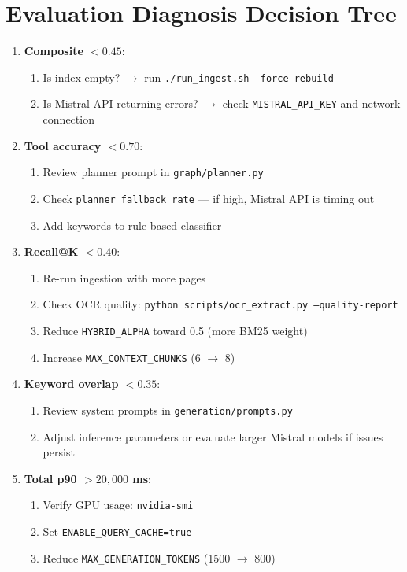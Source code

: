 \documentclass[12pt,a4paper]{report}
\begin{document}
\chapter{Evaluation Diagnosis Decision Tree}

\begin{enumerate}
  \item \textbf{Composite $< 0.45$}:
    \begin{enumerate}
      \item Is index empty? $\rightarrow$ run \texttt{./run\_ingest.sh --force-rebuild}
      \item Is Mistral API returning errors? $\rightarrow$ check \texttt{MISTRAL\_API\_KEY} and network connection
    \end{enumerate}
  \item \textbf{Tool accuracy $< 0.70$}:
    \begin{enumerate}
      \item Review planner prompt in \texttt{graph/planner.py}
      \item Check \texttt{planner\_fallback\_rate} --- if high, Mistral API is timing out
      \item Add keywords to rule-based classifier
    \end{enumerate}
  \item \textbf{Recall@K $< 0.40$}:
    \begin{enumerate}
      \item Re-run ingestion with more pages
      \item Check OCR quality: \texttt{python scripts/ocr\_extract.py --quality-report}
      \item Reduce \texttt{HYBRID\_ALPHA} toward 0.5 (more BM25 weight)
      \item Increase \texttt{MAX\_CONTEXT\_CHUNKS} (6 $\rightarrow$ 8)
    \end{enumerate}
  \item \textbf{Keyword overlap $< 0.35$}:
    \begin{enumerate}
      \item Review system prompts in \texttt{generation/prompts.py}
      \item Adjust inference parameters or evaluate larger Mistral models if issues persist
    \end{enumerate}
  \item \textbf{Total p90 $> 20{,}000$ ms}:
    \begin{enumerate}
      \item Verify GPU usage: \texttt{nvidia-smi}
      \item Set \texttt{ENABLE\_QUERY\_CACHE=true}
      \item Reduce \texttt{MAX\_GENERATION\_TOKENS} (1500 $\rightarrow$ 800)
    \end{enumerate}
\end{enumerate}
\end{document}
